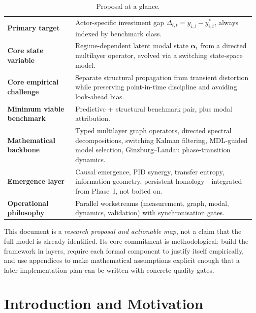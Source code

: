 \documentclass[11pt,a4paper]{article}
\theoremstyle{definition}
\newcommand{\balpha}{\bm{\alpha}}
\begin{document}
\begin{table}[H]
\centering\small
\begin{tabularx}{\textwidth}{@{}>{\bfseries}p{3.1cm}X@{}}
\toprule
Primary target & Actor-specific investment gap $\Delta_{i,t} = y_{i,t} - y^*_{i,t}$, always indexed by benchmark class. \\
Core state variable & Regime-dependent latent modal state $\balpha_t$ from a directed multilayer operator, evolved via a switching state-space model. \\
Core empirical challenge & Separate structural propagation from transient distortion while preserving point-in-time discipline and avoiding look-ahead bias. \\
Minimum viable benchmark & Predictive + structural benchmark pair, plus modal attribution. \\
Mathematical backbone & Typed multilayer graph operators, directed spectral decompositions, switching Kalman filtering, MDL-guided model selection, Ginzburg--Landau phase-transition dynamics. \\
Emergence layer & Causal emergence, PID synergy, transfer entropy, information geometry, persistent homology---integrated from Phase~I, not bolted on. \\
Operational philosophy & Parallel workstreams (measurement, graph, modal, dynamics, validation) with synchronisation gates. \\
\bottomrule
\end{tabularx}
\caption{Proposal at a glance.}
\label{tab:ataglance}
\end{table}

\begin{keybox}
This document is a \emph{research proposal and actionable map}, not a claim that the full model is already identified. Its core commitment is methodological: build the framework in layers, require each formal component to justify itself empirically, and use appendices to make mathematical assumptions explicit enough that a later implementation plan can be written with concrete quality gates.
\end{keybox}

\section{Introduction and Motivation}
\label{sec:intro}
\end{document}
